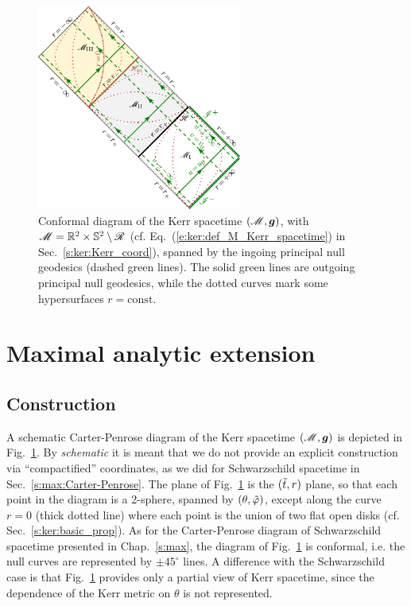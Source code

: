 
\begin{figure}
\centerline{\includegraphics[width=0.6\textwidth]{ker_3blocks_in.pdf}}
\caption[]{\label{f:ker:3blocks_in} \footnotesize
Conformal diagram of the Kerr spacetime $(\mathscr{M},\bm{g})$, with
$\mathscr{M} = \mathbb{R}^2\times\mathbb{S}^2 \setminus \mathscr{R}$ (cf. Eq.~(\ref{e:ker:def_M_Kerr_spacetime}) in Sec.~\ref{s:ker:Kerr_coord}), spanned by the ingoing principal null geodesics (dashed green lines). The solid green lines are outgoing principal null geodesics, while
the dotted curves mark some hypersurfaces $r=\mathrm{const}$.}
\end{figure}


\section{Maximal analytic extension} \label{s:ker:max_extension}

\subsection{Construction}

A schematic Carter-Penrose diagram of the Kerr spacetime $(\mathscr{M},\bm{g})$ is depicted in
Fig.~\ref{f:ker:3blocks_in}.
By \emph{schematic} it is meant that we do not provide an explicit construction
via ``compactified'' coordinates, as we did for Schwarzschild
spacetime in Sec.~\ref{s:max:Carter-Penrose}. The plane of Fig.~\ref{f:ker:3blocks_in}
is the $({\tilde t},r)$ plane, so that
each point in the diagram is a 2-sphere, spanned by $(\theta,{\tilde\varphi})$, except
along the curve $r=0$ (thick dotted line) where each point is the union of
two flat open disks (cf. Sec.~\ref{s:ker:basic_prop}).
As for the Carter-Penrose diagram of Schwarzschild spacetime presented in
Chap.~\ref{s:max}, the diagram of Fig.~\ref{f:ker:3blocks_in} is conformal, i.e.
the null curves are represented by $\pm 45^\circ$ lines. A difference with the Schwarzschild case
is that Fig.~\ref{f:ker:3blocks_in} provides only a partial view of Kerr spacetime, since
the dependence of the Kerr metric on $\theta$ is not represented.

